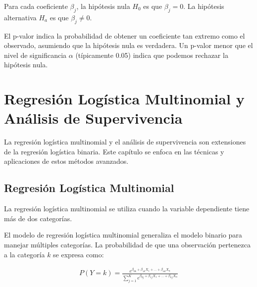 \documentclass[a4paper]{report} %
\begin{document}
Para cada coeficiente $\beta_j$, la hip\'otesis nula $H_0$ es que $\beta_j = 0$. La hip\'otesis alternativa $H_a$ es que $\beta_j \neq 0$.


El p-valor indica la probabilidad de obtener un coeficiente tan extremo como el observado, asumiendo que la hip\'otesis nula es verdadera. Un p-valor menor que el nivel de significancia $\alpha$ (t\'ipicamente 0.05) indica que podemos rechazar la hip\'otesis nula.

\chapter{Regresi\'on Log\'istica Multinomial y An\'alisis de Supervivencia}

La regresi\'on log\'istica multinomial y el an\'alisis de supervivencia son extensiones de la regresi\'on log\'istica binaria. Este cap\'itulo se enfoca en las t\'ecnicas y aplicaciones de estos m\'etodos avanzados.

\section{Regresi\'on Log\'istica Multinomial}

La regresi\'on log\'istica multinomial se utiliza cuando la variable dependiente tiene m\'as de dos categor\'ias.


El modelo de regresi\'on log\'istica multinomial generaliza el modelo binario para manejar m\'ultiples categor\'ias. La probabilidad de que una observaci\'on pertenezca a la categor\'ia $k$ se expresa como:

\begin{eqnarray*}
P(Y = k) = \frac{e^{\beta_{0k} + \beta_{1k} X_1 + \ldots + \beta_{nk} X_n}}{\sum_{j=1}^{K} e^{\beta_{0j} + \beta_{1j} X_1 + \ldots + \beta_{nj} X_n}}
\end{eqnarray*}
\end{document}
